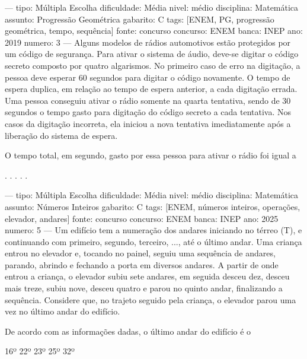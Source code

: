 
---
tipo: Múltipla Escolha
dificuldade: Média
nivel: médio
disciplina: Matemática
assunto: Progressão Geométrica
gabarito: C
tags: [ENEM, PG, progressão geométrica, tempo, sequência]
fonte: concurso
concurso: ENEM
banca: INEP
ano: 2019
numero: 3
---
\question
Alguns modelos de rádios automotivos estão protegidos por um código de segurança. Para ativar o sistema de áudio, deve-se digitar o código secreto composto por quatro algarismos. No primeiro caso de erro na digitação, a pessoa deve esperar 60 segundos para digitar o código novamente. O tempo de espera duplica, em relação ao tempo de espera anterior, a cada digitação errada. Uma pessoa conseguiu ativar o rádio somente na quarta tentativa, sendo de 30 segundos o tempo gasto para digitação do código secreto a cada tentativa. Nos casos da digitação incorreta, ela iniciou a nova tentativa imediatamente após a liberação do sistema de espera.

O tempo total, em segundo, gasto por essa pessoa para ativar o rádio foi igual a
\begin{choices}
.
.
.
.
.
\end{choices}

---
tipo: Múltipla Escolha
dificuldade: Média
nivel: médio
disciplina: Matemática
assunto: Números Inteiros
gabarito: C
tags: [ENEM, números inteiros, operações, elevador, andares]
fonte: concurso
concurso: ENEM
banca: INEP
ano: 2025
numero: 5
---
\question
Um edifício tem a numeração dos andares iniciando no térreo (T), e continuando com primeiro, segundo, terceiro, ..., até o último andar. Uma criança entrou no elevador e, tocando no painel, seguiu uma sequência de andares, parando, abrindo e fechando a porta em diversos andares. A partir de onde entrou a criança, o elevador subiu sete andares, em seguida desceu dez, desceu mais treze, subiu nove, desceu quatro e parou no quinto andar, finalizando a sequência. Considere que, no trajeto seguido pela criança, o elevador parou uma vez no último andar do edifício.

De acordo com as informações dadas, o último andar do edifício é o
\begin{choices}
\choice 16º
\choice 22º
\CorrectChoice 23º
\choice 25º
\choice 32º
\end{choices}


